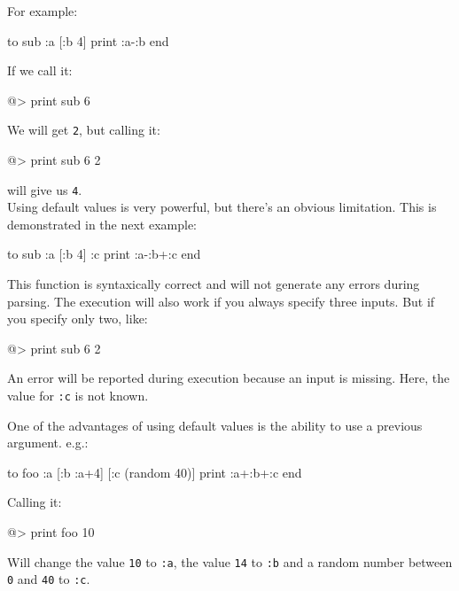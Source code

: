 \begin{verbatimtab}
\end{verbatimtab}
 
For example: 
 
\begin{verbatimtab}
to sub :a [:b 4]
	print :a-:b 
end 
\end{verbatimtab}
 
If we call it: 
 
\begin{verbatimtab}
@> print sub 6 
\end{verbatimtab} 
 
We will get {\tt 2}, but calling it: 
 
\begin{verbatimtab}  
@> print sub 6 2 
\end{verbatimtab}
 
will give us {\tt 4}.\\
 
Using default values is very powerful, but there's an obvious limitation.  This is demonstrated in the next example: 
 
\begin{verbatimtab}
to sub :a [:b 4] :c 
	print :a-:b+:c 
end 
\end{verbatimtab}
 
This function is syntaxically correct and will not generate any errors during parsing.  The execution will also work if you always specify three inputs. But if you specify only two, like: 
 
\begin{verbatimtab}
@> print sub 6 2 
\end{verbatimtab}
 
An error will be reported during execution because an input is missing. Here, the value for {\tt :c} is not known. 
 
One of the advantages of using default values is the ability to use a previous argument. e.g.: 
 
\begin{verbatimtab}
to foo :a [:b :a+4] [:c (random 40)]
	print :a+:b+:c
end 
\end{verbatimtab}
 
Calling it: 
 
\begin{verbatimtab}  
@> print foo 10 
\end{verbatimtab}
 
Will change the value {\tt 10} to {\tt :a}, the value {\tt 14} to {\tt :b} and a random number between {\tt 0} and {\tt 40} to {\tt :c}. 
 
